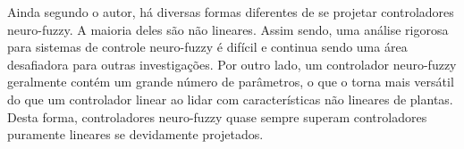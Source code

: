 Ainda segundo o autor, há diversas formas diferentes de se projetar controladores neuro-fuzzy. A maioria deles são não lineares. Assim sendo, uma análise rigorosa para sistemas de controle neuro-fuzzy é difícil e continua sendo uma área desafiadora para outras investigações. Por outro lado, um controlador neuro-fuzzy geralmente contém um grande número de parâmetros, o que o torna mais versátil do que um controlador linear ao lidar com características não lineares de plantas. Desta forma, controladores neuro-fuzzy quase sempre superam controladores puramente lineares se devidamente projetados.


%






